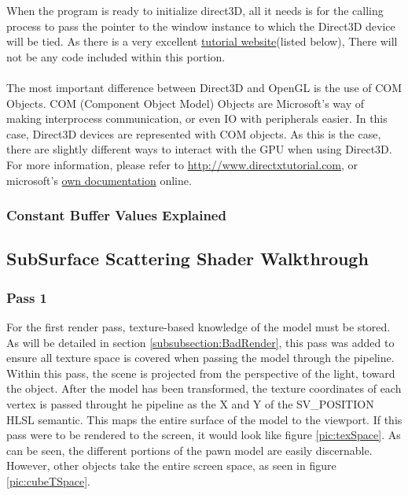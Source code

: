 \documentclass[a4paper, 12pt]{article}
\begin{document}
When the program is ready to initialize direct3D, all it needs is for the
calling process to pass the pointer to the window instance to which the
Direct3D device will be tied. As there is a very excellent
\href{http://www.directxtutorial.com}{tutorial website}(listed below), There
will not be any code included within this portion. \\ \\ The most important
difference between Direct3D and OpenGL is the use of COM Objects. COM
(Component Object Model) Objects are Microsoft's way of making interprocess
communication, or even IO with peripherals easier. In this case, Direct3D
devices are represented with COM objects. As this is the case, there are
slightly different ways to interact with the GPU when using Direct3D. For more
information, please refer to
\href{http://www.directxtutorial.com}{http://www.directxtutorial.com}, or
microsoft's \href{https://msdn.microsoft.com/en-
us/library/windows/desktop/ms690343(v=vs.85).aspx}{own documentation} online.

\subsubsection{Constant Buffer Values Explained}



\subsection{SubSurface Scattering Shader Walkthrough} 

\label{subsection:SSSImplementation}

\subsubsection{Pass 1}

For the first render pass, texture-based knowledge of the model must be
stored. As will be detailed in section \ref{subsubsection:BadRender}, this
pass was added to ensure all texture space is covered when passing the model
through the pipeline. Within this pass, the scene is projected from the
perspective of the light, toward the object. After the model has been
transformed, the texture coordinates of each vertex is passed throught he
pipeline as the X and Y of the SV\_POSITION HLSL semantic. This maps the
entire surface of the model to the viewport. If this pass were to be rendered
to the screen, it would look like figure \ref{pic:texSpace}. As can be seen,
the different portions of the pawn model are easily discernable. However,
other objects take the entire screen space, as seen in figure
\ref{pic:cubeTSpace}. 
\end{document}
